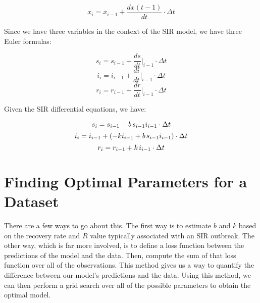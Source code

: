 \documentclass{article}
\begin{document}
\[x_i = x_{i-1} + \frac{dx(t-1)}{dt} \cdot \Delta t\]

\noindent
Since we have three variables in the context of the SIR model, we have three Euler formulas:

\[s_i = s_{i-1} + \frac{ds}{dt}\Bigr|_{i-1} \cdot \Delta t\]
\[i_i = i_{i-1} + \frac{di}{dt}\Bigr|_{i-1}  \cdot \Delta t\]
\[r_i = r_{i-1} + \frac{dr}{dt}\Bigr|_{i-1}  \cdot \Delta t\]

\noindent
Given the SIR differential equations, we have:

\[s_i = s_{i-1} - b \hspace{0.5mm} s_{i-1} i_{i-1} \cdot \Delta t\]
\[i_i = i_{i-1} + (- k i_{i-1} + b \hspace{0.5mm} s_{i-1} i_{i-1}) \cdot \Delta t\]
\[r_i = r_{i-1} + k \hspace{0.5mm} i_{i-1} \cdot \Delta t\]

\section{Finding Optimal Parameters for a Dataset}
There are a few ways to go about this. The first way is to estimate $b$ and $k$ based on the recovery rate and $R$ value typically associated with an SIR outbreak. The other way, which is far more involved, is to define a loss function between the predictions of the model and the data. Then, compute the sum of that loss function over all of the observations. This method gives us a way to quantify the difference between our model's predictions and the data. Using this method, we can then perform a grid search over all of the possible parameters to obtain the optimal model. 
\end{document}
